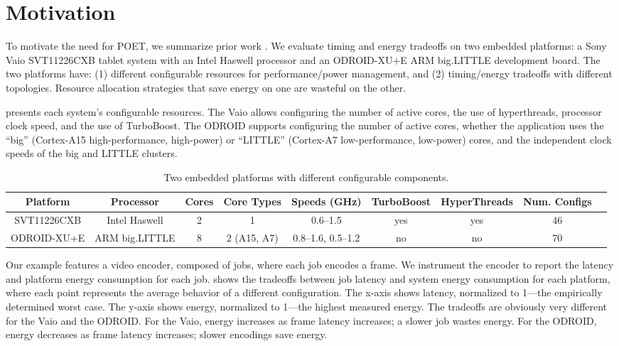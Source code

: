 \section{Motivation}
\label{sec:poet-motivation}

To motivate the need for POET, we summarize prior work \cite{Imes2014}.
We evaluate timing and energy tradeoffs on two embedded platforms: a Sony Vaio SVT11226CXB tablet system with an Intel Haswell processor and an ODROID-XU+E ARM big.LITTLE development board.
The two platforms have: (1) different configurable resources for performance/power management, and (2) timing/energy tradeoffs with different topologies.
Resource allocation strategies that save energy on one are wasteful on the other.

 presents each system's configurable resources.
The Vaio allows configuring the number of active cores, the use of hyperthreads, processor clock speed, and the use of TurboBoost.
The ODROID supports configuring the number of active cores, whether the application uses the ``big'' (Cortex-A15 high-performance, high-power) or ``LITTLE'' (Cortex-A7 low-performance, low-power) cores, and the independent clock speeds of the big and LITTLE clusters.

\begin{table}[t]
\caption{Two embedded platforms with different configurable components.}
\label{tbl:poet-machines}
\tiny
\centering
\begin{tabular}{ccccccccc}
  \textbf{Platform} & 
  \textbf{Processor} &
  \textbf{Cores} & 
  \textbf{Core Types} &
  \textbf{Speeds (GHz)} &
  \textbf{TurboBoost} &
  \textbf{HyperThreads} & 
  \textbf{Num. Configs} \\
  \hline
  \hline
  SVT11226CXB & Intel Haswell  & 2 & 1             & 0.6--1.5          & yes & yes & 46 \\
  ODROID-XU+E & ARM big.LITTLE & 8 & 2 (A15, A7)   & 0.8--1.6, 0.5--1.2 & no  & no  & 70 \\
  \hline 
  \hline
\end{tabular}
\end{table}

Our example features a video encoder, composed of jobs, where each job encodes a frame.
We instrument the encoder to report the latency and platform energy consumption for each job.
 shows the tradeoffs between job latency and system energy consumption for each platform, where each point represents the average behavior of a different configuration.
The x-axis shows latency, normalized to 1---the empirically determined worst case.
The y-axis shows energy, normalized to 1---the highest measured energy.
The tradeoffs are obviously very different for the Vaio and the ODROID.
For the Vaio, energy increases as frame latency increases; \ie a slower job wastes energy.
For the ODROID, energy decreases as frame latency increases; \ie slower encodings save energy.


